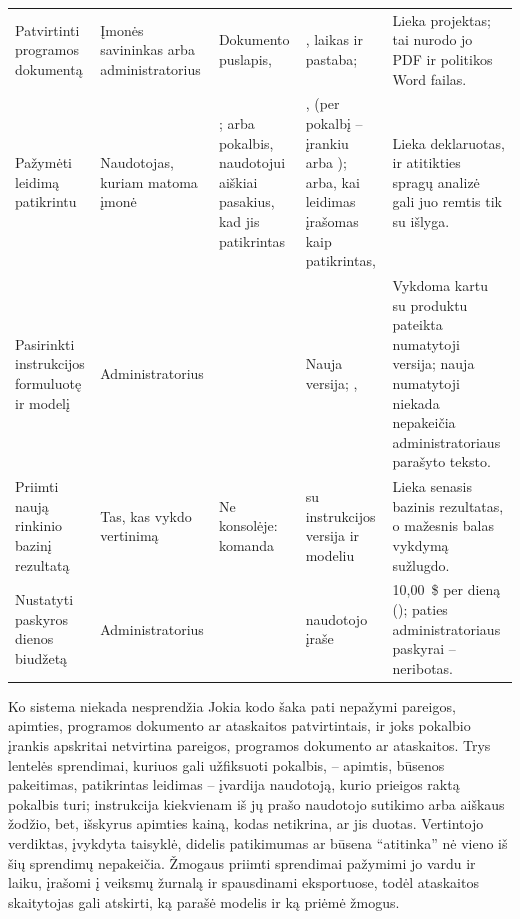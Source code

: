 \begin{xltabular}{\textwidth}{@{}L{25mm}L{18mm}L{24mm}YL{31mm}@{}}
Patvirtinti programos dokumentą & Įmonės savininkas arba administratorius & Dokumento puslapis,  & , laikas ir pastaba;  & Lieka projektas; tai nurodo jo PDF ir politikos Word failas. \\
Pažymėti leidimą patikrintu & Naudotojas, kuriam matoma įmonė & ; arba pokalbis, naudotojui aiškiai pasakius, kad jis patikrintas & ,  (per pokalbį -- įrankiu  arba );  arba, kai leidimas įrašomas kaip patikrintas,  & Lieka deklaruotas, ir atitikties spragų analizė gali juo remtis tik su išlyga. \\
Pasirinkti instrukcijos formuluotę ir modelį & Administratorius &  & Nauja versija; ,  & Vykdoma kartu su produktu pateikta numatytoji versija; nauja numatytoji niekada nepakeičia administratoriaus parašyto teksto. \\
Priimti naują rinkinio bazinį rezultatą & Tas, kas vykdo vertinimą & Ne konsolėje: komanda  &  su instrukcijos versija ir modeliu & Lieka senasis bazinis rezultatas, o mažesnis balas vykdymą sužlugdo. \\
Nustatyti paskyros dienos biudžetą & Administratorius &  &  naudotojo įraše & 10,00~\$ per dieną (); paties administratoriaus paskyrai -- neribotas. \\
\end{xltabular}

\begin{humanbox}{Ko sistema niekada nesprendžia}
Jokia kodo šaka pati nepažymi pareigos, apimties, programos dokumento ar ataskaitos
patvirtintais, ir joks pokalbio įrankis apskritai netvirtina pareigos, programos dokumento ar
ataskaitos. Trys lentelės sprendimai, kuriuos gali užfiksuoti pokalbis, -- apimtis, būsenos
pakeitimas, patikrintas leidimas -- įvardija naudotoją, kurio prieigos raktą pokalbis turi;
instrukcija kiekvienam iš jų prašo naudotojo sutikimo arba aiškaus žodžio, bet, išskyrus
apimties kainą, kodas netikrina, ar jis
duotas.
Vertintojo verdiktas, įvykdyta taisyklė, didelis patikimumas ar būsena \enquote{atitinka}
nė vieno iš šių sprendimų nepakeičia. Žmogaus priimti sprendimai pažymimi jo vardu ir laiku,
įrašomi į veiksmų žurnalą ir spausdinami eksportuose, todėl ataskaitos skaitytojas gali
atskirti, ką parašė modelis ir ką priėmė žmogus.
\end{humanbox}

